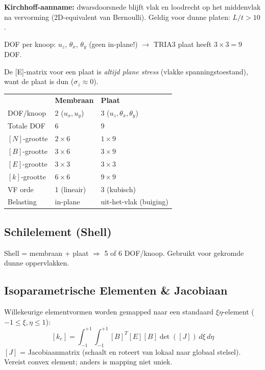 \documentclass[a4paper,10pt]{article}
\begin{document}
\textbf{Kirchhoff-aanname:} dwarsdoorsnede blijft vlak en loodrecht op het middenvlak na vervorming (2D-equivalent van Bernoulli). Geldig voor dunne platen: $L/t > 10$.

DOF per knoop: $u_z$, $\theta_x$, $\theta_y$ (geen in-plane!) $\to$ TRIA3 plaat heeft $3\times3=9$ DOF.

De [E]-matrix voor een plaat is \emph{altijd plane stress} (vlakke spanningstoestand), want de plaat is dun ($\sigma_z \approx 0$).

\begin{exambox}
\begin{tabular}{lll}
 & \textbf{Membraan} & \textbf{Plaat} \\
DOF/knoop & 2 ($u_x, u_y$) & 3 ($u_z, \theta_x, \theta_y$) \\
Totale DOF & 6 & 9 \\
$[N]$-grootte & $2\times6$ & $1\times9$ \\
$[B]$-grootte & $3\times6$ & $3\times9$ \\
$[E]$-grootte & $3\times3$ & $3\times3$ \\
$[k]$-grootte & $6\times6$ & $9\times9$ \\
VF orde & 1 (lineair) & 3 (kubisch) \\
Belasting & in-plane & uit-het-vlak (buiging) \\
\end{tabular}
\end{exambox}

\subsection*{Schilelement (Shell)}

Shell = membraan + plaat $\Rightarrow$ 5 of 6 DOF/knoop. Gebruikt voor gekromde dunne oppervlakken.

\subsection*{Isoparametrische Elementen \& Jacobiaan}

Willekeurige elementvormen worden gemapped naar een standaard $\xi\eta$-element ($-1 \le \xi,\eta \le 1$):
\[
  [k_e] = \int_{-1}^{+1}\int_{-1}^{+1} [B]^T[E][B]\det([J])\,d\xi\,d\eta
\]
$[J]$ = Jacobiaanmatrix (schaalt en roteert van lokaal naar globaal stelsel). Vereist convex element; anders is mapping niet uniek.

\end{document}
